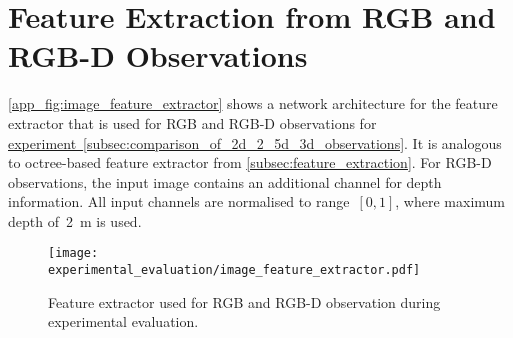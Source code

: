 \section{Feature Extraction from RGB and RGB-D Observations}\label{app:feature_extraction_from_rgb_and_rgbd_observations}

\autoref{app_fig:image_feature_extractor} shows a network architecture for the feature extractor that is used for RGB and RGB-D observations for \hyperref[subsec:comparison_of_2d_2_5d_3d_observations]{experiment~\ref*{subsec:comparison_of_2d_2_5d_3d_observations}}. It is analogous to octree-based feature extractor from \autoref{subsec:feature_extraction}. For RGB-D observations, the input image contains an additional channel for depth information. All input channels are normalised to range~\([0, 1]\), where maximum depth of~2~m is used.

\setcounter{figure}{0}
\begin{figure}[ht]
    \centering
    \texttt{[image: experimental\_evaluation/image\_feature\_extractor.pdf]}
    \caption{Feature extractor used for RGB and RGB-D observation during experimental evaluation.}
    \label{app_fig:image_feature_extractor}
\end{figure}
